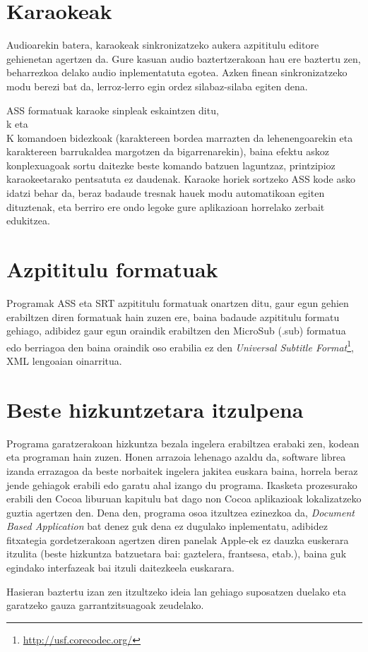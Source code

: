 \section{Karaokeak}
Audioarekin batera, karaokeak sinkronizatzeko aukera azpititulu editore gehienetan agertzen da. Gure kasuan audio baztertzerakoan hau ere baztertu zen, beharrezkoa delako audio inplementatuta egotea. Azken finean sinkronizatzeko modu berezi bat da, lerroz-lerro egin ordez silabaz-silaba egiten dena.

ASS formatuak karaoke sinpleak eskaintzen ditu, \\k eta \\K komandoen bidezkoak (karaktereen bordea marrazten da lehenengoarekin eta karaktereen barrukaldea margotzen da bigarrenarekin), baina efektu askoz konplexuagoak sortu daitezke beste komando batzuen laguntzaz, printzipioz karaokeetarako pentsatuta ez daudenak. Karaoke horiek sortzeko ASS kode asko idatzi behar da, beraz badaude tresnak hauek modu automatikoan egiten dituztenak, eta berriro ere ondo legoke gure aplikazioan horrelako zerbait edukitzea.

\section{Azpititulu formatuak}
Programak ASS eta SRT azpititulu formatuak onartzen ditu, gaur egun gehien erabiltzen diren formatuak hain zuzen ere, baina badaude azpititulu formatu gehiago, adibidez gaur egun oraindik erabiltzen den MicroSub (.sub) formatua edo berriagoa den baina oraindik oso erabilia ez den \textit{Universal Subtitle Format}\footnote{\url{http://usf.corecodec.org/}}, XML lengoaian oinarritua.

\section{Beste hizkuntzetara itzulpena}
Programa garatzerakoan hizkuntza bezala ingelera erabiltzea erabaki zen, kodean eta programan hain zuzen. Honen arrazoia lehenago azaldu da, software librea izanda errazagoa da beste norbaitek ingelera jakitea euskara baina, horrela beraz jende gehiagok erabili edo garatu ahal izango du programa. Ikasketa prozesurako erabili den Cocoa liburuan\cite{hi:08} kapitulu bat dago non Cocoa aplikazioak lokalizatzeko guztia agertzen den. Dena den, programa osoa itzultzea ezinezkoa da, \textit{Document Based Application} bat denez guk dena ez dugulako inplementatu, adibidez fitxategia gordetzerakoan agertzen diren panelak Apple-ek ez dauzka euskerara itzulita (beste hizkuntza batzuetara bai: gaztelera, frantsesa, etab.), baina guk egindako interfazeak bai itzuli daitezkeela euskarara.

Hasieran baztertu izan zen itzultzeko ideia lan gehiago suposatzen duelako eta garatzeko gauza garrantzitsuagoak zeudelako.
